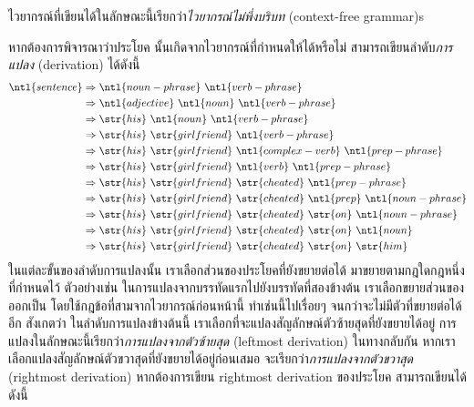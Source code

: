 ไวยากรณ์ที่เขียนได้ในลักษณะนี้เรียกว่า\emph{ไวยากรณ์ไม่พึ่งบริบท} (context-free grammar)s

หากต้องการพิจารณาว่าประโยค  นั้นเกิดจากไวยากรณ์ที่กำหนดให้ได้หรือไม่ สามารถเขียนลำดับ\emph{การแปลง} (derivation) ได้ดังนี้
\begin{align*}
\ntl{sentence}
 &\Rightarrow \ntl{noun-phrase}\ \ntl{verb-phrase} \\
 &\Rightarrow \ntl{adjective}\ \ntl{noun}\ \ntl{verb-phrase} \\
 &\Rightarrow \str{his}\ \ntl{noun}\ \ntl{verb-phrase} \\
 &\Rightarrow \str{his}\ \str{girlfriend}\ \ntl{verb-phrase} \\
 &\Rightarrow \str{his}\ \str{girlfriend}\ \ntl{complex-verb}\ \ntl{prep-phrase} \\
 &\Rightarrow \str{his}\ \str{girlfriend}\ \ntl{verb}\ \ntl{prep-phrase} \\
 &\Rightarrow \str{his}\ \str{girlfriend}\ \str{cheated}\ \ntl{prep-phrase} \\
 &\Rightarrow \str{his}\ \str{girlfriend}\ \str{cheated}\ \ntl{prep}\ \ntl{noun-phrase} \\
 &\Rightarrow \str{his}\ \str{girlfriend}\ \str{cheated}\ \str{on}\ \ntl{noun-phrase} \\
 &\Rightarrow \str{his}\ \str{girlfriend}\ \str{cheated}\ \str{on}\ \ntl{noun} \\
 &\Rightarrow \str{his}\ \str{girlfriend}\ \str{cheated}\ \str{on}\ \str{him}
\end{align*}
ในแต่ละขั้นของลำดับการแปลงนั้น เราเลือกส่วนของประโยคที่ยังขยายต่อได้ มาขยายตามกฎใดกฎหนึ่งที่กำหนดไว้ ตัวอย่างเช่น ในการแปลงจากบรรทัดแรกไปยังบรรทัดที่สองข้างต้น เราเลือกขยายส่วนของ  ออกเป็น  โดยใช้กฎข้อที่สามจากไวยากรณ์ก่อนหน้านี้ \enskip ทำเช่นนี้ไปเรื่อยๆ จนกว่าจะไม่มีตัวที่ขยายต่อได้อีก \enskip สังเกตว่า ในลำดับการแปลงข้างต้นนี้ เราเลือกที่จะแปลงสัญลักษณ์ตัวซ้ายสุดที่ยังขยายได้อยู่ การแปลงในลักษณะนี้เรียกว่า\emph{การแปลงจากตัวซ้ายสุด} (leftmost derivation) \enskip ในทางกลับกัน หากเราเลือกแปลงสัญลักษณ์ตัวขวาสุดที่ยังขยายได้อยู่ก่อนเสมอ จะเรียกว่า\emph{การแปลงจากตัวขวาสุด} (rightmost derivation) \enskip หากต้องการเขียน rightmost derivation ของประโยค  สามารถเขียนได้ดังนี้
